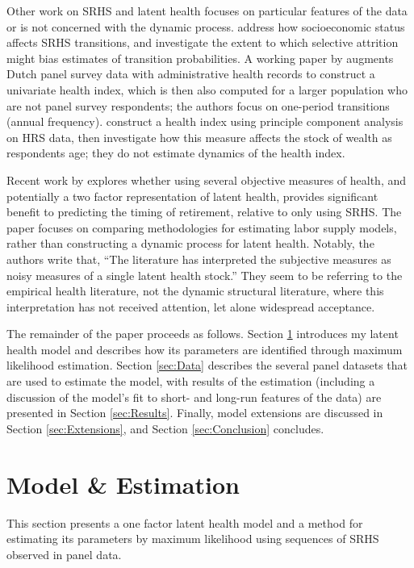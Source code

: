 \documentclass[12pt,pdftex,letterpaper]{article}
\begin{document}
Other work on SRHS and latent health focuses on particular features of the data or is not concerned with the dynamic process.  \cite{Contoyannis04} address how socioeconomic status affects SRHS transitions, and investigate the extent to which selective attrition might bias estimates of transition probabilities.  A working paper by \cite{Alessie15} augments Dutch panel survey data with administrative health records to construct a univariate health index, which is then also computed for a larger population who are not panel survey respondents; the authors focus on one-period transitions (annual frequency).  \cite{Poterba17} construct a health index using principle component analysis on HRS data, then investigate how this measure affects the stock of wealth as respondents age; they do not estimate dynamics of the health index.

Recent work by \cite{Blundell17} explores whether using several objective measures of health, and potentially a two factor representation of latent health, provides significant benefit to predicting the timing of retirement, relative to only using SRHS.  The paper focuses on comparing methodologies for estimating labor supply models, rather than constructing a dynamic process for latent health.  Notably, the authors write that, ``The literature has interpreted the subjective measures as noisy measures of a single latent health stock.'' They seem to be referring to the empirical health literature, not the dynamic structural literature, where this interpretation has not received attention, let alone widespread acceptance.

The remainder of the paper proceeds as follows.  Section \ref{sec:ModelAndEst} introduces my latent health model and describes how its parameters are identified through maximum likelihood estimation.  Section \ref{sec:Data} describes the several panel datasets that are used to estimate the model, with  results of the estimation (including a discussion of the model's fit to short- and long-run features of the data) are presented in Section \ref{sec:Results}.  Finally, model extensions are discussed in Section \ref{sec:Extensions}, and Section \ref{sec:Conclusion} concludes.


\section{Model \& Estimation}\label{sec:ModelAndEst}

This section presents a one factor latent health model and a method for estimating its parameters by maximum likelihood using sequences of SRHS observed in panel data.
\end{document}
